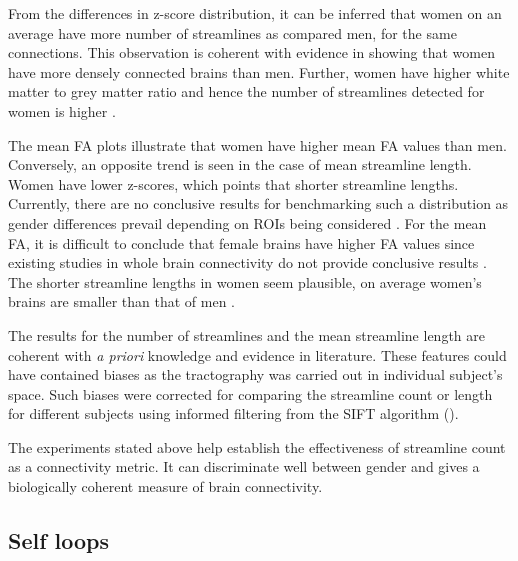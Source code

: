 \documentclass[msthesis.tex]{subfiles}
\begin{document}
From the differences in z-score distribution, it can be inferred that women on an average have more number of streamlines as compared men, for the same connections. This observation is coherent with evidence in \cite{szalkai2015graph} showing that women have more densely connected brains than men. Further, women have higher white matter to grey matter ratio and hence the number of streamlines detected for women is higher \citep{taki2011correlations}.

The mean \gls{FA} plots illustrate that women have higher mean FA values than men. Conversely, an opposite trend is seen in the case of mean streamline length. Women have lower z-scores, which points that shorter streamline lengths. Currently, there are no conclusive results for benchmarking such a distribution as gender differences prevail depending on ROIs being considered \citep{kanaan2012gender}. For the mean FA, it is difficult to conclude that female brains have higher FA values since existing studies in whole brain connectivity do not provide conclusive results \citep{ingalhalikar2014sex}. The shorter streamline lengths in women seem plausible, on average women's brains are smaller than that of men \citep{ankney1992sex}.

The results for the number of streamlines and the mean streamline length are coherent with \textit{a priori} knowledge and evidence in literature. These features could have contained biases as the tractography was carried out in individual subject's space. Such biases were corrected for comparing the streamline count or length for different subjects using informed filtering from the SIFT algorithm (\cite{yeh2020mapping}).

The experiments stated above help establish the effectiveness of streamline count as a connectivity metric. It can discriminate well between gender and gives a biologically coherent measure of brain connectivity.

\subsection{Self loops}
\label{res:selfloops}
\end{document}

